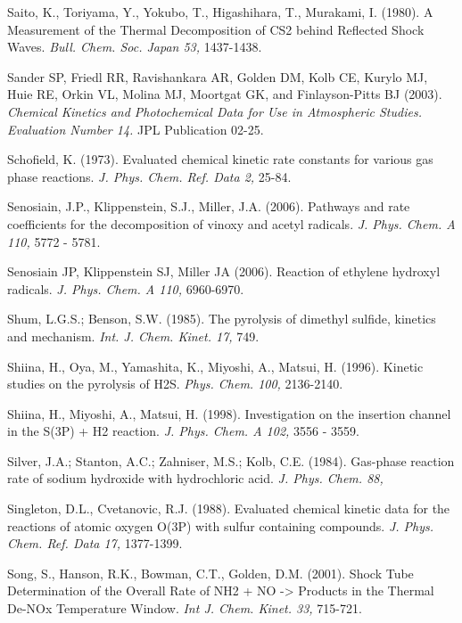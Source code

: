 \documentclass[12pt,landscape]{article}
\newcounter{reaction}
\begin{document}
Saito, K., Toriyama, Y., Yokubo, T., Higashihara, T., Murakami, I. (1980). A Measurement of the Thermal Decomposition of CS2 behind Reflected Shock Waves. {\em Bull. Chem. Soc. Japan 53,} 1437-1438.

Sander SP, Friedl RR,  Ravishankara AR, Golden DM, Kolb CE, Kurylo MJ, Huie RE, Orkin VL, Molina MJ, Moortgat GK, and Finlayson-Pitts BJ (2003).
{\em Chemical Kinetics and Photochemical Data for Use in Atmospheric Studies. Evaluation Number 14.} JPL Publication 02-25.

Schofield, K.  (1973).  Evaluated chemical kinetic rate constants for various gas phase reactions.  {\em J. Phys. Chem. Ref. Data 2,} 25-84.

  Senosiain, J.P., Klippenstein, S.J., Miller, J.A. (2006). Pathways and rate coefficients for the decomposition of vinoxy and acetyl radicals.  {\em J. Phys. Chem. A 110,} 5772 - 5781.

Senosiain JP, Klippenstein SJ, Miller JA (2006).  Reaction of ethylene hydroxyl radicals.  {\em J. Phys. Chem. A 110,} 6960-6970.

Shum, L.G.S.; Benson, S.W. (1985). The pyrolysis of dimethyl sulfide, kinetics and mechanism.  {\em Int. J. Chem. Kinet. 17,} 749.

Shiina, H., Oya, M., Yamashita, K., Miyoshi, A., Matsui, H. (1996). Kinetic studies on the pyrolysis of H2S. {\em  Phys. Chem. 100,} 2136-2140.

Shiina, H., Miyoshi, A., Matsui, H. (1998). Investigation on the insertion channel in the S(3P) + H2 reaction.  {\em J. Phys. Chem. A 102,} 3556 - 3559.

Silver, J.A.; Stanton, A.C.; Zahniser, M.S.; Kolb, C.E. (1984). Gas-phase reaction rate of sodium hydroxide with hydrochloric acid.  {\em J. Phys. Chem.  88,}

Singleton, D.L., Cvetanovic, R.J.  (1988). Evaluated chemical kinetic data for the reactions of atomic oxygen O(3P) with sulfur containing compounds.  {\em J. Phys. Chem. Ref. Data 17,} 1377-1399.

Song, S., Hanson, R.K., Bowman, C.T., Golden, D.M.  (2001). Shock Tube Determination of the Overall Rate of NH2 + NO -> Products in the Thermal De-NOx Temperature Window.  {\em Int J. Chem. Kinet. 33,} 715-721.
\end{document}

